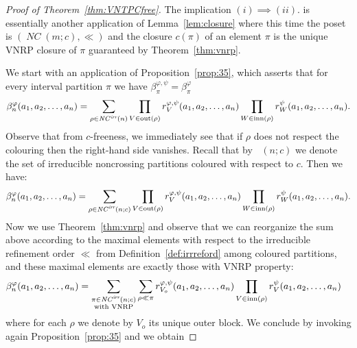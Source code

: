 \documentclass[12pt]{amsart}
\DeclareMathOperator{\NC}{\mathit{NC}} %
\DeclareMathOperator{\NCirr}{{\mathit{NC}^\textit{irr}}} %
\DeclareMathOperator{\VNRPirr}{{\mathit{VNRP}^\textit{irr}}} %
\DeclareMathOperator{\IB}{\mathrm{inn}} %
\DeclareMathOperator{\OB}{\mathrm{out}} %
\theoremstyle{definition}
\numberwithin{equation}{section}
\begin{document}
		
		
\begin{proof}[Proof of Theorem~\ref{thm:VNTPCfree}]
  The implication $(i)\implies (ii)$.
 is essentially another application of Lemma~\ref{lem:closure}
  where   this time the poset is $(\NC(m;c), \ll)$
  and the closure   $c(\pi)$ of an element $\pi$ is the unique VNRP
  closure of $\pi$ guaranteed by Theorem~\ref{thm:vnrp}.
  
  
  We start with an application of
  Proposition~\ref{prop:35},
  which asserts that for every interval partition $\pi$ we have $\beta^{\varphi,\psi}_\pi=\beta^{\varphi}_\pi$
  \begin{align*}
    \beta_n^{\varphi} (a_1,a_2, \ldots , a_n)
    =\sum_{\rho\in \NCirr(n)}
    \prod_{
    V\in\OB(\rho)
    }
    r_{V}^{\varphi,\psi}(a_1,a_2,\ldots,a_n)
    \prod_{
    W\in\IB(\rho)            
    }
    r_{W}^{\psi}(a_1,a_2,\ldots,a_n).
  \end{align*}
  Observe that from $c$-freeness, we immediately see that if $\rho$ does not
  respect the colouring then the right-hand side vanishes. Recall that by
  $\NCirr(n;c)$ we denote the set of irreducible noncrossing partitions  coloured with respect to
  $c$. Then we have: 
  \begin{align*}
    \beta_n^{\varphi} (a_1,a_2,\ldots, a_n)
    =\sum_{\substack{\rho\in \NCirr(n;c)}}
    \prod_{V\in \OB(\rho)}
    r_{V}^{\varphi,\psi}(a_1,a_2,\ldots,a_n)
    \prod_{
    W\in\IB(\rho)                      
    }
    r_{W}^{\psi}(a_1,a_2,\ldots,a_n).
  \end{align*}
  Now we use Theorem~\ref{thm:vnrp}
  and observe that we can reorganize the sum
  above according to the maximal elements with respect to the
  irreducible refinement order
  $\ll$
  from Definition~\ref{def:irrreford}
  among   coloured partitions,
  and these maximal elements are exactly those with VNRP
  property: 
  \begin{align*}
    \beta_n^{\varphi} (a_1,a_2, \ldots , a_n)
    &= \sum_{
        \substack{
          \pi \in \NCirr(n;c) \\
          \textnormal{with VNRP}
        }
    }
    \sum_{
    \rho\ll\pi %
    }
    r_{V_o}^{\varphi,\psi}(a_1,a_2,\ldots,a_n)
    \prod_{
    V\in\IB(\rho)            
    }
    r_{V}^{\psi}(a_1,a_2,\ldots,a_n)
  \end{align*}
  where for each $\rho$ we denote by $V_o$ its unique outer block.
  We conclude by invoking again Proposition~\ref{prop:35} and we obtain 
  

\end{proof}
\end{document}
